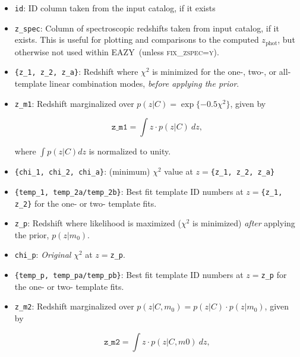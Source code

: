 \documentclass[11pt]{article}
\newcommand{\eazy}{\textsc{EAZY}}
\begin{document}
\begin{itemize}

\item \texttt{id}: ID column taken from the input catalog, if it exists

\item \texttt{z\_spec}:  Column of spectroscopic redshifts
taken from input catalog, if it exists.  This is useful for
plotting and comparisons to the computed $z_\mathrm{phot}$,
but otherwise not used within \eazy\ (unless
\textsc{fix\_zspec=y}).

\item \texttt{\{z\_1, z\_2, z\_a\}}: Redshift where $\chi^2$
is minimized for the one-, two-, or all-template linear
combination modes, \textit{before applying the prior}.

\item \texttt{z\_m1}: Redshift marginalized over $p(z|C) = \exp\{-0.5 \chi^2\}$, given by 

\begin{equation}
\mathtt{z\_m1} = \int z\cdot p(z|C)\ dz, \label{zm1}
\end{equation}

\noindent  where $\int p(z|C) dz$ is normalized to unity.

\item \texttt{\{chi\_1, chi\_2, chi\_a\}}: (minimum)
$\chi^2$ value at $z=$\texttt{\{z\_1, z\_2, z\_a\}}

\item \texttt{\{temp\_1, temp\_2a/temp\_2b\}}: Best fit
template ID numbers at $z=$\texttt{\{z\_1, z\_2\}} for the
one- or two- template fits.

\item \texttt{z\_p}: Redshift where likelihood is maximized
($\chi^2$ is minimized) \textit{after} applying the prior,
$p(z|m_0)$.

\item \texttt{chi\_p}: \textit{Original} $\chi^2$ at $z=$\texttt{z\_p}.

\item \texttt{\{temp\_p, temp\_pa/temp\_pb\}}: Best fit
template ID numbers at $z=$\texttt{z\_p} for the one- or
two- template fits.

\item \texttt{z\_m2}: Redshift marginalized over $p(z|C,
m_0) =p(z|C) \cdot p(z|m_0)$, given by

\begin{equation}
\mathtt{z\_m2} = \int z\cdot p(z|C,m0)\ dz, \label{zm2}
\end{equation}


\end{itemize}
\end{document}
